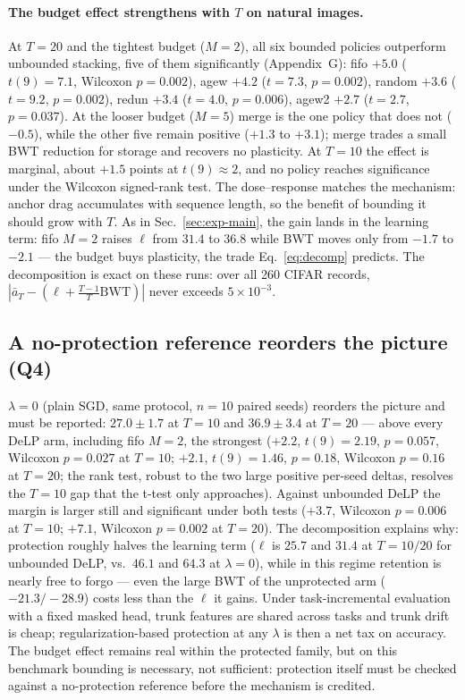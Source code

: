 \documentclass[review,11pt,number]{elsarticle}
\newcommand{\delp}{DeLP}
\begin{document}
\begin{sloppypar}
\paragraph{The budget effect strengthens with $T$ on natural images.}
At $T{=}20$ and the tightest budget ($M{=}2$), all six bounded
policies outperform unbounded stacking, five of them significantly
(Appendix~G): fifo $+5.0$
($t(9){=}7.1$, Wilcoxon $p{=}0.002$), agew $+4.2$ ($t{=}7.3$, $p{=}0.002$),
random $+3.6$ ($t{=}9.2$, $p{=}0.002$), redun $+3.4$ ($t{=}4.0$,
$p{=}0.006$), agew2 $+2.7$ ($t{=}2.7$, $p{=}0.037$). At the looser budget
($M{=}5$) merge is the one policy that does not ($-0.5$), while the other
five remain positive ($+1.3$ to $+3.1$); merge trades a small BWT
reduction for storage and recovers no plasticity. At $T{=}10$ the effect
is marginal, about $+1.5$ points at $t(9)\approx 2$, and no policy
reaches significance under the Wilcoxon signed-rank test.
The dose--response matches the mechanism: anchor drag accumulates with
sequence length, so the benefit of bounding it should grow with $T$. As
in Sec.~\ref{sec:exp-main}, the gain lands in the learning term: fifo
$M{=}2$ raises $\ell$ from $31.4$ to $36.8$ while BWT moves only from
$-1.7$ to $-2.1$ --- the budget buys plasticity, the trade
Eq.~\ref{eq:decomp} predicts. The decomposition is exact on these runs:
over all 260 CIFAR records,
$|\bar a_T - (\ell + \frac{T-1}{T}\mathrm{BWT})|$ never exceeds
$5\times10^{-3}$.
\end{sloppypar}

\subsection{A no-protection reference reorders the picture (Q4)}
\label{sec:exp-noprot}

$\lambda{=}0$ (plain SGD, same protocol, $n{=}10$ paired seeds)
reorders the picture and must be reported: $27.0\pm1.7$ at $T{=}10$
and $36.9\pm3.4$ at $T{=}20$ --- above every \delp{} arm, including
fifo $M{=}2$, the strongest ($+2.2$, $t(9){=}2.19$, $p{=}0.057$,
Wilcoxon $p{=}0.027$ at $T{=}10$; $+2.1$, $t(9){=}1.46$, $p{=}0.18$,
Wilcoxon $p{=}0.16$ at $T{=}20$; the rank test, robust to the two
large positive per-seed deltas, resolves the $T{=}10$ gap that the
t-test only approaches). Against unbounded \delp{} the margin is
larger still and significant under both tests ($+3.7$, Wilcoxon
$p{=}0.006$ at $T{=}10$; $+7.1$, Wilcoxon $p{=}0.002$ at $T{=}20$). The
decomposition explains why: protection roughly halves the learning
term ($\ell$ is $25.7$ and $31.4$ at $T{=}10/20$ for unbounded \delp{},
vs.\ $46.1$ and $64.3$ at $\lambda{=}0$), while in this regime
retention is nearly free to
forgo --- even the large BWT of the unprotected arm ($-21.3/-28.9$)
costs less than the $\ell$ it gains. Under task-incremental evaluation
with a fixed masked head, trunk features are shared across tasks and
trunk drift is cheap; regularization-based protection at any $\lambda$
is then a net tax on accuracy. The budget effect remains real within
the protected family, but on this benchmark bounding is necessary, not
sufficient: protection itself must be checked against a no-protection
reference before the mechanism is credited.
\end{document}

